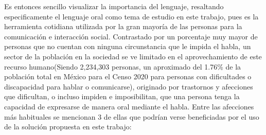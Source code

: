 \hfill \break
\justifying
Es entonces sencillo visualizar la importancia del lenguaje, resaltando especificamente el lenguaje oral como tema de estudio en este trabajo, pues es la herramienta cotidiana utilizada por la gran mayoría de las personas para la comunicación e interacción social. Contrastado por un porcentaje muy mayor de personas que no cuentan con ninguna circunstancia que le impida el habla, un sector de la población en la sociedad se ve limitado en el aprovechamiento de este recurso humano(Siendo 2,234,303 personas, un aproximado del 1.76\% de la población total en México para el Censo 2020 para personas con dificultades o discapacidad para hablar o comunicarse), originado por trastornos y afecciones que dificultan, o incluso impiden e imposibilitan, que una persona tenga la capacidad de expresarse de manera oral mediante el habla.
Entre las afecciones más habituales se mencionan 3 de ellas que podrían verse beneficiadas por el uso de la solución propuesta en este trabajo:
